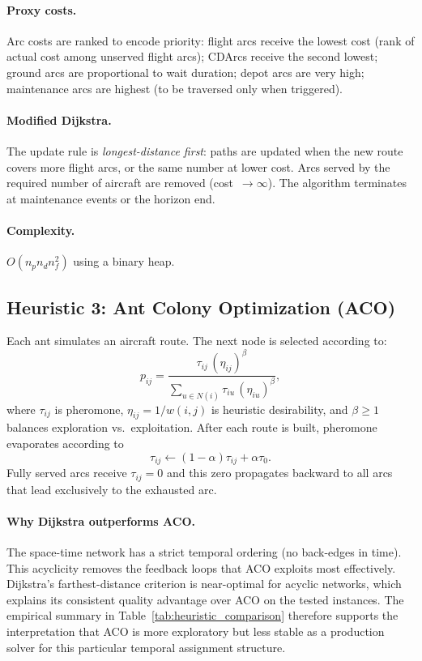 \paragraph{Proxy costs.}
Arc costs are ranked to encode priority: flight arcs receive the lowest cost
(rank of actual cost among unserved flight arcs); CDArcs receive the second
lowest; ground arcs are proportional to wait duration; depot arcs are very high;
maintenance arcs are highest (to be traversed only when triggered).

\paragraph{Modified Dijkstra.}
The update rule is \emph{longest-distance first}: paths are updated when the
new route covers more flight arcs, or the same number at lower cost.  Arcs
served by the required number of aircraft are removed (cost~$\to\infty$).
The algorithm terminates at maintenance events or the horizon end.

\paragraph{Complexity.}
$O(n_p n_d n_f^2)$ using a binary heap.

{\sloppy
\subsection{Heuristic 3: Ant Colony Optimization (ACO)}

Each ant simulates an aircraft route.  The next node is selected according to:
\begin{equation}
  p_{ij} = \frac{\tau_{ij}\,(\eta_{ij})^\beta}
  {\sum_{u \in N(i)} \tau_{iu}\,(\eta_{iu})^\beta},
\end{equation}
where $\tau_{ij}$ is pheromone, $\eta_{ij} = 1/w(i,j)$ is heuristic
desirability, and $\beta \ge 1$ balances exploration vs.\ exploitation.
After each route is built, pheromone evaporates according to
\begin{equation}
  \tau_{ij} \leftarrow (1-\alpha)\tau_{ij} + \alpha\tau_0.
\end{equation}
Fully served arcs receive $\tau_{ij} = 0$ and this zero propagates backward
to all arcs that lead exclusively to the exhausted arc.
}

\paragraph{Why Dijkstra outperforms ACO.}
The space-time network has a strict temporal ordering (no back-edges in time).
This acyclicity removes the feedback loops that ACO exploits most effectively.
Dijkstra's farthest-distance criterion is near-optimal for acyclic networks,
which explains its consistent quality advantage over ACO on the tested
instances.  The empirical summary in Table~\ref{tab:heuristic_comparison}
therefore supports the interpretation that ACO is more exploratory but less
stable as a production solver for this particular temporal assignment
structure.

